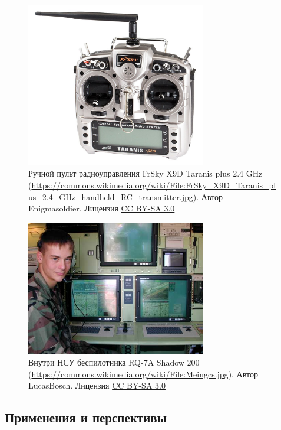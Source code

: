 \documentclass[specification,annotation]{itmo-student-thesis}
\begin{document}
\begin{figure}[H]
  \caption{Ручной пульт радиоуправления FrSky X9D Taranis plus 2.4 GHz
  (\url{https://commons.wikimedia.org/wiki/File:FrSky_X9D_Taranis_plus_2.4_GHz_handheld_RC_transmitter.jpg}).
  Автор Enigmasoldier. Лицензия
  \href{https://creativecommons.org/licenses/by-sa/3.0/deed.en}{CC BY-SA 3.0}
  }\label{pic:rc-tx}
  \centering
  \includegraphics[width=0.7\textwidth]{rc-tx}
\end{figure}

\begin{figure}[H]
  \caption{Внутри НСУ беспилотника RQ-7A Shadow 200
  (\url{https://commons.wikimedia.org/wiki/File:Meingcs.jpg}).
  Автор LucasBosch. Лицензия
  \href{https://creativecommons.org/licenses/by-sa/3.0/deed.en}{CC BY-SA 3.0}
  }\label{pic:gcs}
  \centering
  \includegraphics[width=0.7\textwidth]{gcs}
\end{figure}

\subsection{Применения и перспективы}\label{subsec:uas-applications}
\end{document}
